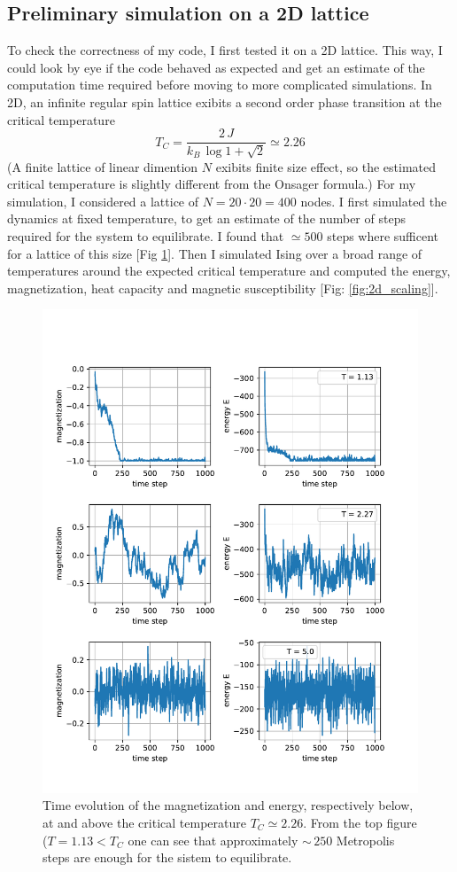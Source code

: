 {\subsection*{Preliminary simulation on a 2D lattice}
{\small
To check the correctness of my code, I first tested it on a 2D lattice. This way, I could look by eye if the code behaved as expected and get an estimate of the computation time required before moving to more complicated simulations. 
In 2D, an infinite regular spin lattice exibits a second order phase transition at the critical
temperature 
\begin{equation}
T_C = \frac{2\,J}{k_B\,\log{1 + \sqrt{2}}} \simeq 2.26
  \end{equation}  
    \label{eq:onsager}
(A finite lattice of linear dimention $N$ exibits finite size effect, so the estimated critical temperature is slightly different from the Onsager formula.)
For my simulation, I considered a lattice of $N = 20 \cdot 20 = 400$ nodes. I first simulated the dynamics at fixed temperature, to get an estimate of the number of steps required for the system to equilibrate. I found that $\simeq 500$ steps where sufficent for a lattice of this size [Fig \ref{fig:2d_relaxation}]. Then I simulated Ising over a broad range of temperatures around the expected critical temperature and computed the energy, magnetization, heat capacity and magnetic susceptibility [Fig: \ref{fig:2d_scaling}].
}
\begin{figure}[H]
    \centering
    \includegraphics[width=0.6\linewidth]{latex_source/images/ising/2d_relaxation.pdf}
    \caption{{\small Time evolution of the magnetization and energy, respectively below, at and above the critical temperature $T_C \simeq 2.26$. From the top figure ($T = 1.13 < T_C$ one can see that approximately $\sim\,250$ Metropolis steps are enough for the sistem to equilibrate.}}
    \label{fig:2d_relaxation}
\end{figure}

}
